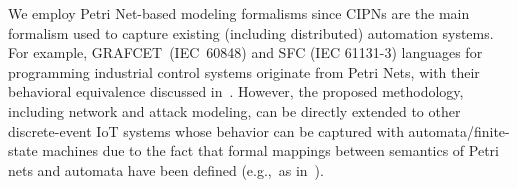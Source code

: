 \begin{remark}
We employ Petri Net-based modeling formalisms since CIPNs are the main formalism used to capture existing (including distributed) automation  systems. %
For example, GRAFCET~(IEC~60848) and SFC (IEC 61131-3) languages for programming
industrial control systems originate from Petri Nets, with their behavioral equivalence discussed in~\cite{David20101,GRAFCETtoTPN,SFCtoTPN}.
However, %
the proposed methodology, including network and attack modeling, can be directly extended to other discrete-event IoT systems whose behavior can be captured with automata/finite-state machines due to the fact that formal mappings between semantics of Petri nets and automata have been defined (e.g.,~as in~\cite{PNtransformation1,PNtransformation2}).\QEDE
\end{remark}
